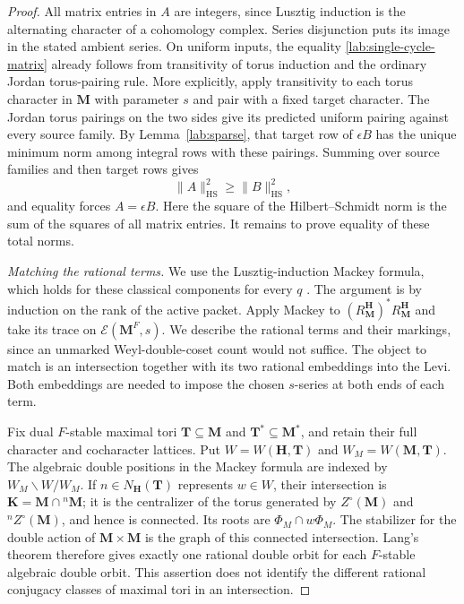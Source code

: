 \begin{proof}
All matrix entries in $A$ are integers, since Lusztig induction
is the alternating character of a cohomology complex.  Series
disjunction puts its image in the stated ambient series.  On
uniform inputs, the equality \eqref{lab:single-cycle-matrix}
already follows from transitivity of torus induction and the
ordinary Jordan torus-pairing rule.  More explicitly, apply
transitivity to each torus character in $\mathbf M$ with
parameter $s$ and pair with a fixed target character.  The
Jordan torus pairings on the two sides give its predicted
uniform pairing against every source family.  By
Lemma~\ref{lab:sparse}, that target row of $\epsilon B$ has
the unique minimum norm among integral rows with these pairings.
Summing over source families and then target rows gives
\begin{equation}\label{lab:norm-min}
 \|A\|_{\mathrm{HS}}^2\ge\|B\|_{\mathrm{HS}}^2,
\end{equation}
and equality forces $A=\epsilon B$.  Here the square of the
Hilbert--Schmidt norm is the sum of the squares of all matrix
entries.  It remains to prove equality of these total norms.

\smallskip\noindent\emph{Matching the rational terms.}
We use the Lusztig-induction Mackey formula, which holds for
these classical components for every $q$
\cite[Theorem~3.8(4)]{BonnafeMichel}.
The argument is by induction on the rank of the active packet.
Apply Mackey to
$({R^{\mathbf H}_{\mathbf M}})^*R^{\mathbf H}_{\mathbf M}$
and take its trace on $\mathcal E(\mathbf M^F,s)$.
We describe the rational terms and their markings, since an
unmarked Weyl-double-coset count would not suffice.
The object to match is an intersection together with its two
rational embeddings into the Levi.  Both embeddings are needed
to impose the chosen $s$-series at both ends of each term.

Fix dual $F$-stable maximal tori $\mathbf T\subseteq\mathbf M$
and $\mathbf T^*\subseteq\mathbf M^*$, and retain their full
character and cocharacter lattices.  Put
$W=W(\mathbf H,\mathbf T)$ and $W_M=W(\mathbf M,\mathbf T)$.
The algebraic double positions in the Mackey formula are indexed
by $W_M\backslash W/W_M$.  If $n\in N_{\mathbf H}(\mathbf T)$
represents $w\in W$, their
intersection is
$\mathbf K=\mathbf M\cap{}^n\mathbf M$; it is the centralizer
of the torus generated by $Z^\circ(\mathbf M)$ and
${}^nZ^\circ(\mathbf M)$, and hence is connected.  Its roots
are $\Phi_M\cap w\Phi_M$.  The stabilizer for the double action
of $\mathbf M\times\mathbf M$ is the graph of this connected
intersection.  Lang's theorem therefore gives exactly one
rational double orbit for each $F$-stable algebraic double orbit.
This assertion does not identify the different rational conjugacy
classes of maximal tori in an intersection.


\end{proof}
